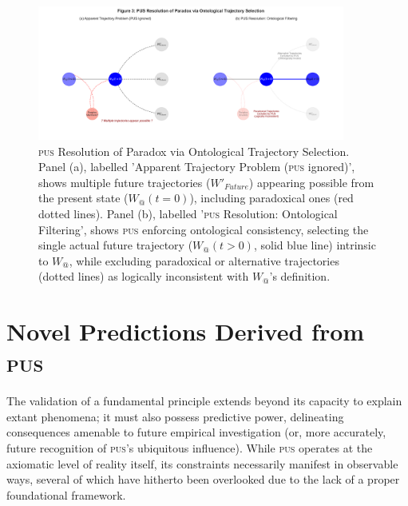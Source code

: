 \documentclass[11pt, a4paper]{article}
\makeatletter
\newcommand{\pus}{\textsc{pus}} %
\newcommand{\Wactual}{W_{@}} %
\makeatother
\begin{document}
\FloatBarrier


\begin{figure}[htbp]
    \centering
    \includegraphics[width=0.9\textwidth]{figures/pus_figure3_paradox_paths.png} %
    \caption{\pus{} Resolution of Paradox via Ontological Trajectory Selection. Panel (a), labelled 'Apparent Trajectory Problem (\pus{} ignored)', shows multiple future trajectories ($W'_{Future}$) appearing possible from the present state ($W_{@}(t=0)$), including paradoxical ones (red dotted lines). Panel (b), labelled '\pus{} Resolution: Ontological Filtering', shows \pus{} enforcing ontological consistency, selecting the single actual future trajectory ($W_{@}(t>0)$, solid blue line) intrinsic to $\Wactual$, while excluding paradoxical or alternative trajectories (dotted lines) as logically inconsistent with $\Wactual$'s definition.}
    \label{fig:paradox}
\end{figure}
\FloatBarrier 

\section{Novel Predictions Derived from \pus}
The validation of a fundamental principle extends beyond its capacity to explain extant phenomena; it must also possess predictive power, delineating consequences amenable to future empirical investigation (or, more accurately, future recognition of \pus's ubiquitous influence). While \pus{} operates at the axiomatic level of reality itself, its constraints necessarily manifest in observable ways, several of which have hitherto been overlooked due to the lack of a proper foundational framework.
\end{document}
